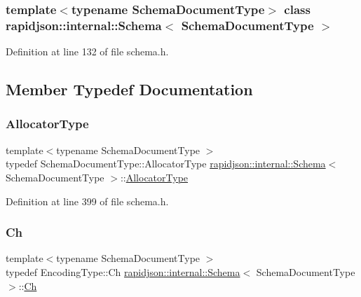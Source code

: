 \subsubsection*{template$<$typename Schema\+Document\+Type$>$\newline
class rapidjson\+::internal\+::\+Schema$<$ Schema\+Document\+Type $>$}



Definition at line 132 of file schema.\+h.



\subsection{Member Typedef Documentation}
\mbox{\label{classrapidjson_1_1internal_1_1_schema_aaca940c164d906fdbf504f562bb2f956}} 
\subsubsection{\texorpdfstring{AllocatorType}{AllocatorType}}
{\footnotesize\ttfamily template$<$typename Schema\+Document\+Type $>$ \\
typedef Schema\+Document\+Type\+::\+Allocator\+Type \mbox{\hyperlink{classrapidjson_1_1internal_1_1_schema}{rapidjson\+::internal\+::\+Schema}}$<$ Schema\+Document\+Type $>$\+::\mbox{\hyperlink{classrapidjson_1_1internal_1_1_schema_aaca940c164d906fdbf504f562bb2f956}{Allocator\+Type}}}



Definition at line 399 of file schema.\+h.

\mbox{\label{classrapidjson_1_1internal_1_1_schema_ab9093cbc42067b8e1d3745eafe096ab3}} 
\subsubsection{\texorpdfstring{Ch}{Ch}}
{\footnotesize\ttfamily template$<$typename Schema\+Document\+Type $>$ \\
typedef Encoding\+Type\+::\+Ch \mbox{\hyperlink{classrapidjson_1_1internal_1_1_schema}{rapidjson\+::internal\+::\+Schema}}$<$ Schema\+Document\+Type $>$\+::\mbox{\hyperlink{classrapidjson_1_1internal_1_1_schema_ab9093cbc42067b8e1d3745eafe096ab3}{Ch}}}



